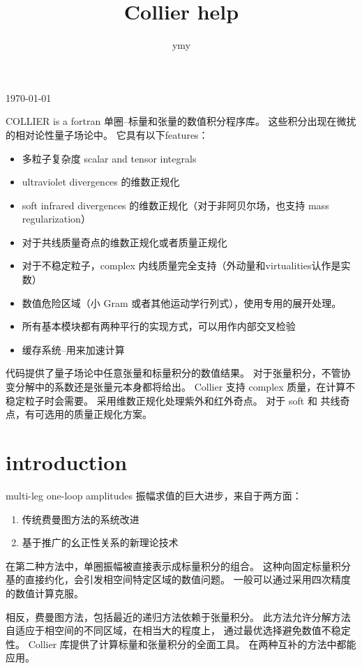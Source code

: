 \documentclass{ctexart}
\begin{document}
\title{Collier help}
\author{ymy}
\today
\maketitle 

COLLIER is a fortran 单圈--标量和张量的数值积分程序库。
这些积分出现在微扰的相对论性量子场论中。
它具有以下features：

\begin{itemize}
\item 多粒子复杂度 scalar and tensor integrals
\item ultraviolet divergences 的维数正规化
\item soft infrared divergences 的维数正规化（对于非阿贝尔场，也支持 mass regularization）
\item 对于共线质量奇点的维数正规化或者质量正规化
\item 对于不稳定粒子，complex 内线质量完全支持（外动量和virtualities认作是实数）
\item 数值危险区域（小 Gram 或者其他运动学行列式），使用专用的展开处理。
\item 所有基本模块都有两种平行的实现方式，可以用作内部交叉检验
\item 缓存系统--用来加速计算
\end{itemize}

代码提供了量子场论中任意张量和标量积分的数值结果。
对于张量积分，不管协变分解中的系数还是张量元本身都将给出。
Collier 支持 complex 质量，在计算不稳定粒子时会需要。
采用维数正规化处理紫外和红外奇点。
对于 soft 和 共线奇点，有可选用的质量正规化方案。

\section{introduction}

multi-leg one-loop amplitudes 振幅求值的巨大进步，来自于两方面：

\begin{enumerate}
    \item 传统费曼图方法的系统改进
    \item 基于推广的幺正性关系的新理论技术
\end{enumerate}

在第二种方法中，单圈振幅被直接表示成标量积分的组合。
这种向固定标量积分基的直接约化，会引发相空间特定区域的数值问题。
一般可以通过采用四次精度的数值计算克服。

相反，费曼图方法，包括最近的递归方法依赖于张量积分。
此方法允许分解方法自适应于相空间的不同区域，在相当大的程度上，
通过最优选择避免数值不稳定性。
Collier 库提供了计算标量和张量积分的全面工具。
在两种互补的方法中都能应用。
\end{document}
